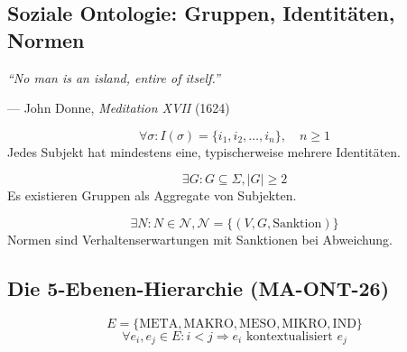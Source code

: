 \subsection{Soziale Ontologie: Gruppen, Identitäten, Normen}

\epigraph{\textit{``No man is an island, entire of itself.''}}{--- John Donne, \textit{Meditation XVII} (1624)}

\begin{axiom}
\begin{equation}
\forall \sigma: I(\sigma) = \{i_1, i_2, \ldots, i_n\}, \quad n \geq 1
\end{equation}
Jedes Subjekt hat mindestens eine, typischerweise mehrere Identitäten.
\end{axiom}

\begin{axiom}
\begin{equation}
\exists G: G \subseteq \Sigma, |G| \geq 2
\end{equation}
Es existieren Gruppen als Aggregate von Subjekten.
\end{axiom}

\begin{axiom}
\begin{equation}
\exists N: N \in \mathcal{N}, \mathcal{N} = \{(V, G, \text{Sanktion})\}
\end{equation}
Normen sind Verhaltenserwartungen mit Sanktionen bei Abweichung.
\end{axiom}

\subsection{Die 5-Ebenen-Hierarchie (MA-ONT-26)}

\begin{axiom}
\begin{equation}
E = \{\text{META}, \text{MAKRO}, \text{MESO}, \text{MIKRO}, \text{IND}\}
\end{equation}
\begin{equation}
\forall e_i, e_j \in E: i < j \Rightarrow e_i \text{ kontextualisiert } e_j
\end{equation}
\end{axiom}

